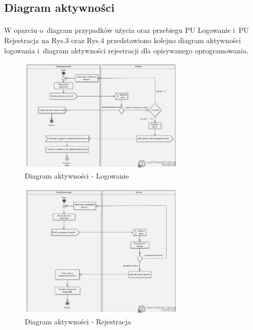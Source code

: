 \documentclass[12pt, letterpaper]{article}
\begin{document}
\newpage
\subsection{Diagram aktywności}
\paragraph{}		
W oparciu o~diagram przypadków użycia oraz przebiegu PU Logowanie i~PU Rejestracja na Rys.3 oraz Rys.4 przedstawiono kolejno diagram aktywności logowania i~diagram aktywności rejestracji dla opisywanego oprogramowania.
		
\begin{figure}[h]
  \centering
      \includegraphics[width=0.7\textwidth]{aclogowanie}
  \caption{Diagram aktywności - Logowanie}
\end{figure}

\begin{figure}[h]
  \centering
      \includegraphics[width=0.7\textwidth]{acrejestracja}
  \caption{Diagram aktywności - Rejestracja}
\end{figure}
		
\end{document}
